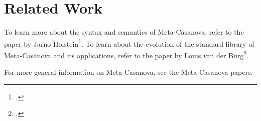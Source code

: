 \section{Related Work}
To learn more about the syntax and semantics of Meta-Casanova, refer to the paper by Jarno Holstein\footcite{holstein16}.
To learn about the evolution of the standard library of Meta-Casanova and its applications, refer to the paper by Louis van der Burg\footcite{vanderburg16}.

For more general information on Meta-Casanova, see the Meta-Casanova papers.
